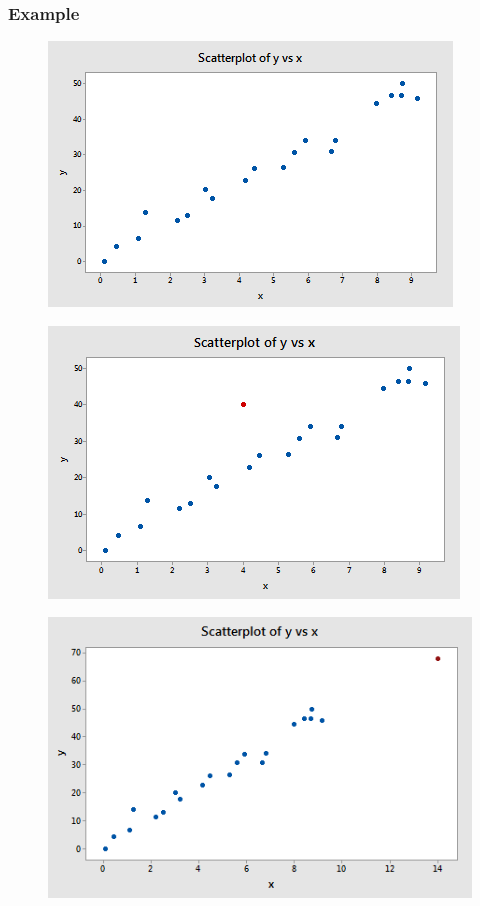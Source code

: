\documentclass[
	11pt, %
]{beamer}
\begin{document}
\begin{frame}[allowframebreaks]
	\frametitle{Example}
	\begin{figure}
		\includegraphics[scale=0.9]{influ_scatter_01.png}
	\end{figure}
	\begin{figure}
		\includegraphics[scale=0.9]{influ_scatter_02.png}
	\end{figure} 
	\begin{figure}
		\includegraphics[scale=0.8]{influ_scatter_06.png}

\end{figure}
\end{frame}
\end{document}
